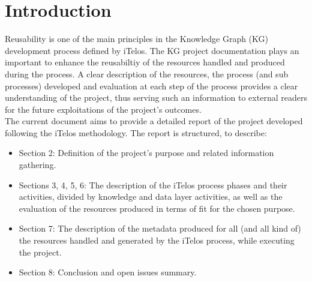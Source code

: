 \section{Introduction}
Reusability is one of the main principles in the Knowledge Graph (KG) development process defined by iTelos. The KG project documentation plays an important to enhance the reusabiltiy of the resources handled and produced during the process. A clear description of the resources, the process (and sub processes) developed and evaluation at each step of the process provides a clear understanding of the project, thus serving such an information to external readers for the future exploitations of the project's outcomes.\\

\noindent The current document aims to provide a detailed report of the project developed following the iTelos methodology. The report is structured, to describe:
\begin{itemize}
    \item Section 2: Definition of the project's purpose and related information gathering.
    
    \item Sections 3, 4, 5, 6: The description of the iTelos process phases and their activities, divided by knowledge and data layer activities, as well as the evaluation of the resources produced in terms of fit for the chosen purpose.

    \item Section 7: The description of the metadata produced for all (and all kind of) the resources handled and generated by the iTelos process, while executing the project.

    \item Section 8: Conclusion and open issues summary.
\end{itemize}